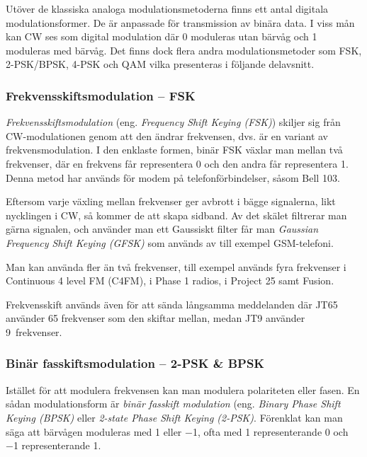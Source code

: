 Utöver de klassiska analoga modulationsmetoderna finns ett antal digitala
modulationsformer.
De är anpassade för transmission av binära data.
I viss mån kan CW ses som digital modulation där 0 moduleras utan bärvåg
och 1 moduleras med bärvåg.
Det finns dock flera andra modulationsmetoder som FSK, 2-PSK/BPSK, 4-PSK och
QAM vilka presenteras i följande delavsnitt.

\subsubsection{Frekvensskiftsmodulation -- FSK}

\emph{Frekvensskiftsmodulation} (eng. \emph{Frequency Shift Keying (FSK)})
skiljer sig från CW-modulationen genom att den ändrar frekvensen, dvs. är en
variant av frekvensmodulation. I den enklaste formen, binär FSK växlar man
mellan två frekvenser, där en frekvens får representera 0 och den andra får
representera 1. Denna metod har används för modem på telefonförbindelser,
såsom Bell 103.

Eftersom varje växling mellan frekvenser ger avbrott i bägge signalerna,
likt nycklingen i CW, så kommer de att skapa sidband. Av det skälet filtrerar man
gärna signalen, och använder man ett Gaussiskt filter får man
\emph{Gaussian Frequency Shift Keying (GFSK)} som används av till exempel GSM-telefoni.

Man kan använda fler än två frekvenser, till exempel används fyra frekvenser i Continuous
4 level FM (C4FM), i Phase 1 radios, i Project 25 samt Fusion.

Frekvensskift används även för att sända långsamma meddelanden där JT65
använder 65 frekvenser som den skiftar mellan, medan JT9 använder 9~frekvenser.

\subsubsection{Binär fasskiftsmodulation -- 2-PSK \& BPSK}

Istället för att modulera frekvensen kan man modulera polariteten eller fasen.
En sådan modulationsform är \emph{binär fasskift modulation} (eng.
\emph{Binary Phase Shift Keying (BPSK)} eller \emph{2-state Phase Shift Keying
(2-PSK)}.
Förenklat kan man säga att bärvågen moduleras med \num{+1} eller \num{-1}, ofta
med \num{+1} representerande \num{0} och \num{-1} representerande \num{1}.

